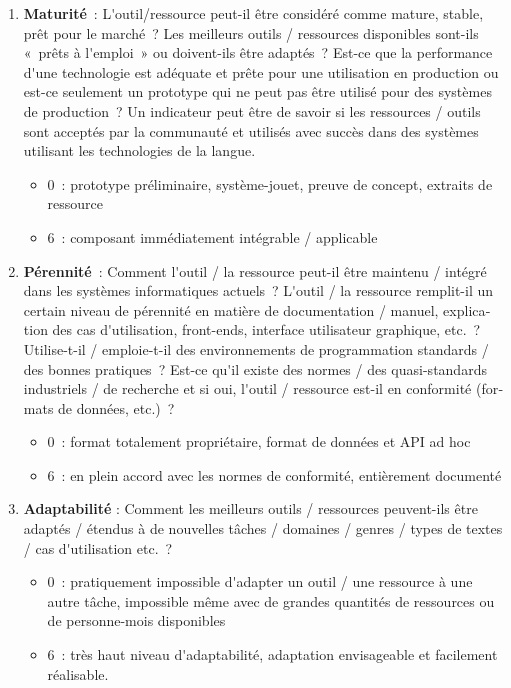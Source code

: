 \begin{french}
\begin{multicols}{2}
\begin{enumerate}
\item {\bf Maturité}~: L{\mbox '}outil/ressource peut-il être considéré comme mature, stable, prêt pour le marché~? Les meilleurs outils / ressources disponibles sont-ils «~prêts à l{\mbox '}emploi~» ou doivent-ils être adaptés~? Est-ce que la performance d{\mbox '}une technologie est adéquate et prête pour une utilisation en production ou est-ce seulement un prototype qui ne peut pas être utilisé pour des systèmes de production~? Un indicateur peut être de savoir si les ressources / outils sont acceptés par la communauté et utilisés avec succès dans des systèmes utilisant les technologies de la langue.  
     \begin{itemize}
      \item 0~: prototype préliminaire, système-jouet, preuve de concept, extraits de ressource
      \item 6~: composant immédiatement intégrable / applicable
      \end{itemize}

\item {\bf Pérennité}~: Comment l{\mbox '}outil / la ressource peut-il être maintenu / intégré dans les systèmes informatiques actuels~? L{\mbox '}outil / la ressource remplit-il un certain niveau de pérennité en matière de documentation / manuel, explication des cas d{\mbox '}utilisation, front-ends, interface utilisateur graphique, etc.~? Utilise-t-il / emploie-t-il des environnements de programmation standards / des bonnes pratiques~? Est-ce qu{\mbox '}il existe des normes / des quasi-standards industriels / de recherche et si oui, l{\mbox '}outil / ressource est-il en conformité (formats de données, etc.)~? 
      \begin{itemize}
      \item 0~: format totalement propriétaire, format de données et API ad hoc
      \item 6~: en plein accord avec les normes de conformité, entièrement documenté
      \end{itemize}

\item {\bf Adaptabilité} : Comment les meilleurs outils / ressources peuvent-ils être adaptés / étendus à de nouvelles tâches / domaines / genres / types de textes / cas d{\mbox '}utilisation etc.~? 
\begin{itemize}
      \item 0~: pratiquement impossible d{\mbox '}adapter un outil / une ressource à une autre tâche, impossible même avec de grandes quantités de ressources ou de personne-mois disponibles
      \item 6~: très haut niveau d{\mbox '}adaptabilité, adaptation envisageable et facilement réalisable.
      \end{itemize}
\end{enumerate}


\end{multicols}
\end{french}
